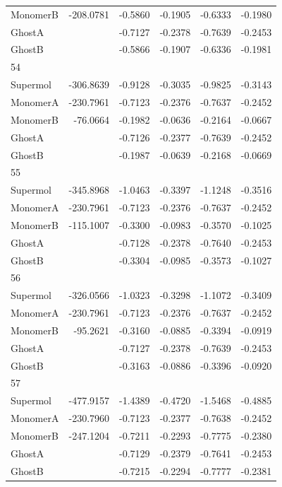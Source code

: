 \documentclass[journal=jctcce,manuscript=article]{achemso}
\begin{document}
\begin{spacing}{1}
\begin{longtable}{lRRRRR}
    MonomerB & -208.0781 & -0.5860 & -0.1905 & -0.6333 & -0.1980 \\
    GhostA &  & -0.7127 & -0.2378 & -0.7639 & -0.2453 \\
    GhostB &  & -0.5866 & -0.1907 & -0.6336 & -0.1981 \\
    54 &  &  &  &  &  \\
    Supermol & -306.8639 & -0.9128 & -0.3035 & -0.9825 & -0.3143 \\
    MonomerA & -230.7961 & -0.7123 & -0.2376 & -0.7637 & -0.2452 \\
    MonomerB & -76.0664 & -0.1982 & -0.0636 & -0.2164 & -0.0667 \\
    GhostA &  & -0.7126 & -0.2377 & -0.7639 & -0.2452 \\
    GhostB &  & -0.1987 & -0.0639 & -0.2168 & -0.0669 \\
    55 &  &  &  &  &  \\
    Supermol & -345.8968 & -1.0463 & -0.3397 & -1.1248 & -0.3516 \\
    MonomerA & -230.7961 & -0.7123 & -0.2376 & -0.7637 & -0.2452 \\
    MonomerB & -115.1007 & -0.3300 & -0.0983 & -0.3570 & -0.1025 \\
    GhostA &  & -0.7128 & -0.2378 & -0.7640 & -0.2453 \\
    GhostB &  & -0.3304 & -0.0985 & -0.3573 & -0.1027 \\
    56 &  &  &  &  &  \\
    Supermol & -326.0566 & -1.0323 & -0.3298 & -1.1072 & -0.3409 \\
    MonomerA & -230.7961 & -0.7123 & -0.2376 & -0.7637 & -0.2452 \\
    MonomerB & -95.2621 & -0.3160 & -0.0885 & -0.3394 & -0.0919 \\
    GhostA &  & -0.7127 & -0.2378 & -0.7639 & -0.2453 \\
    GhostB &  & -0.3163 & -0.0886 & -0.3396 & -0.0920 \\
    57 &  &  &  &  &  \\
    Supermol & -477.9157 & -1.4389 & -0.4720 & -1.5468 & -0.4885 \\
    MonomerA & -230.7960 & -0.7123 & -0.2377 & -0.7638 & -0.2452 \\
    MonomerB & -247.1204 & -0.7211 & -0.2293 & -0.7775 & -0.2380 \\
    GhostA &  & -0.7129 & -0.2379 & -0.7641 & -0.2453 \\
    GhostB &  & -0.7215 & -0.2294 & -0.7777 & -0.2381 \\

\end{longtable}
\end{spacing}
\end{document}
